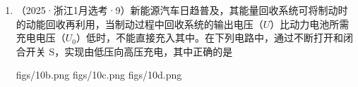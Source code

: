 \documentclass[\gkver]{gaokaozhenti}
\newcommand{\source}[1]{{\sffamily（#1）}}
\begin{document}
\begin{enumerate}
{B．闭合开关后，电容器充电，充电完成后相当于断路，所以 A$_{2}$ 亮一下后熄灭，B 错误；

C．稳定后，电容器相当于断路，线圈相当于短路，所以 A$_{1}$、A$_{3}$ 串联，所以一样亮，C 正确；

D．稳定后，电容器与 A$_{3}$ 并联，两端电压等于 A$_{3}$ 两端电压，由于线圈电阻和电源内阻忽略不计，且 A$_{1}$、A$_{3}$ 串联，A$_{3}$ 两端电压为 $\frac{1}{2}E$，根据 $Q = CU$，可得电容器的电荷量等于 $\frac{1}{2}CE$，D 错误。

故选 C。
}

\item
\source{2025·浙江1月选考·9}新能源汽车日趋普及，其能量回收系统可将制动时的动能回收再利用，当制动过程中回收系统的输出电压（$U$）比动力电池所需充电电压（$U_{0}$）低时，不能直接充入其中。在下列电路中，通过不断打开和闭合开关 S，实现由低压向高压充电，其中正确的是

{figs/10b.png}
{figs/10c.png}
{figs/10d.png}


\end{enumerate}
\end{document}
